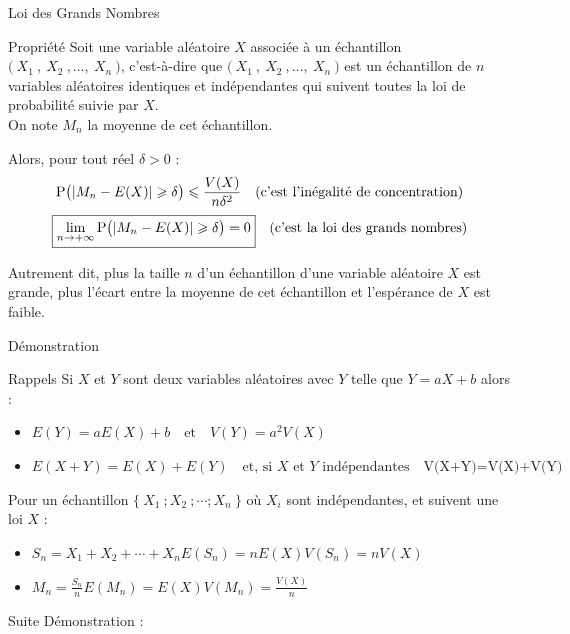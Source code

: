 \documentclass{coursbook}
\begin{document}
    \begin{Gpartie}{Loi des Grands Nombres}
        \vspace*{-2ex}
        \begin{Spartie}{Propriété} 
            Soit une variable aléatoire $X$ associée à un échantillon $\big(~X_1~,~X_2~,\dotsc,~X_n~\big)$, c'est-à-dire que $\big(~X_1~,~X_2~,\dotsc,~X_n~\big)$ est un échantillon de $n$ variables aléatoires identiques et indépendantes qui suivent toutes la loi de probabilité suivie par $X$. \ \\ On note $M_n$ la moyenne de cet échantillon. 
            
            Alors, pour tout réel $\delta>0$ : \[\Pde\big(\lvert M_n-E(X)\rvert\geq\delta\big)\leq\frac{V(X)}{n\delta^2}\quad\text{(c'est l'inégalité de concentration)}\]\[\boxed{\lim\limits_{n\to +\infty}\mathrm{P}\big(\lvert M_n-E(X)\rvert\geqslant\delta\big)=0}\quad\text{(c'est la loi des grands nombres)}\]

            Autrement dit, plus la taille $n$ d'un échantillon d'une variable aléatoire $X$ est grande, plus l'écart entre la moyenne de cet échantillon et l'espérance de $X$ est faible. \pagebreak
            \begin{SSpartie}{Démonstration} 
                \vspace*{-2ex}
                \begin{SSSpartie}{Rappels} 
                    Si $X$ et $Y$ sont deux variables aléatoires avec $Y$ telle que $Y=aX+b$ alors :
                    \begin{itemize}
                        \item $E(Y)=aE(X)+b\quad\text{et}\quad V(Y)=a^2V(X)$
                        \item $E(X+Y)=E(X)+E(Y)\quad\text{et, si $X$ et $Y$ indépendantes}\quad \mbox{V(X+Y)=V(X)+V(Y)}$
                    \end{itemize}

                    Pour un échantillon $\big\{~X_1~;X_2~;\dotsb;X_n ~\big\}$ où $X_i$ sont indépendantes, et suivent une loi $X$ :
                    \begin{itemize}
                        \item $S_n=X_1+X_2+\dotsb+X_n$\quad$E\left(S_n\right)=nE(X)$\quad$V\left(S_n\right)=nV(X)$
                        \item $M_n=\frac{S_n}{n}$\quad$E\left(M_n\right)=E(X)$\quad$V\left(M_n\right)=\frac{V(X)}{n}$
                    \end{itemize}
                \end{SSSpartie}
                Suite Démonstration :


\end{SSpartie}
\end{Spartie}
\end{Gpartie}
\end{document}
